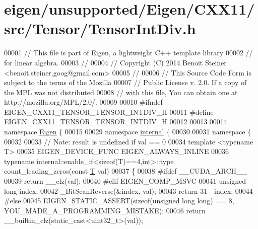 \hypertarget{eigen_2unsupported_2_eigen_2_c_x_x11_2src_2_tensor_2_tensor_int_div_8h_source}{}\section{eigen/unsupported/\+Eigen/\+C\+X\+X11/src/\+Tensor/\+Tensor\+Int\+Div.h}
\label{eigen_2unsupported_2_eigen_2_c_x_x11_2src_2_tensor_2_tensor_int_div_8h_source}

\begin{DoxyCode}
00001 \textcolor{comment}{// This file is part of Eigen, a lightweight C++ template library}
00002 \textcolor{comment}{// for linear algebra.}
00003 \textcolor{comment}{//}
00004 \textcolor{comment}{// Copyright (C) 2014 Benoit Steiner <benoit.steiner.goog@gmail.com>}
00005 \textcolor{comment}{//}
00006 \textcolor{comment}{// This Source Code Form is subject to the terms of the Mozilla}
00007 \textcolor{comment}{// Public License v. 2.0. If a copy of the MPL was not distributed}
00008 \textcolor{comment}{// with this file, You can obtain one at http://mozilla.org/MPL/2.0/.}
00009 
00010 \textcolor{preprocessor}{#ifndef EIGEN\_CXX11\_TENSOR\_TENSOR\_INTDIV\_H}
00011 \textcolor{preprocessor}{#define EIGEN\_CXX11\_TENSOR\_TENSOR\_INTDIV\_H}
00012 
00013 
00014 \textcolor{keyword}{namespace }\hyperlink{namespace_eigen}{Eigen} \{
00015 
00029 \textcolor{keyword}{namespace }\hyperlink{namespaceinternal}{internal} \{
00030 
00031 \textcolor{keyword}{namespace }\{
00032 
00033   \textcolor{comment}{// Note: result is undefined if val == 0}
00034   \textcolor{keyword}{template} <\textcolor{keyword}{typename} T>
00035   EIGEN\_DEVICE\_FUNC EIGEN\_ALWAYS\_INLINE
00036   \textcolor{keyword}{typename} internal::enable\_if<sizeof(T)==4,int>::type count\_leading\_zeros(\textcolor{keyword}{const} 
      \hyperlink{group___sparse_core___module_class_eigen_1_1_triplet}{T} val)
00037   \{
00038 \textcolor{preprocessor}{#ifdef \_\_CUDA\_ARCH\_\_}
00039     \textcolor{keywordflow}{return} \_\_clz(val);
00040 \textcolor{preprocessor}{#elif EIGEN\_COMP\_MSVC}
00041     \textcolor{keywordtype}{unsigned} \textcolor{keywordtype}{long} index;
00042     \_BitScanReverse(&index, val);
00043     \textcolor{keywordflow}{return} 31 - index;
00044 \textcolor{preprocessor}{#else}
00045     EIGEN\_STATIC\_ASSERT(\textcolor{keyword}{sizeof}(\textcolor{keywordtype}{unsigned} \textcolor{keywordtype}{long} \textcolor{keywordtype}{long}) == 8, YOU\_MADE\_A\_PROGRAMMING\_MISTAKE);
00046     \textcolor{keywordflow}{return} \_\_builtin\_clz(static\_cast<uint32\_t>(val));

\end{DoxyCode}
